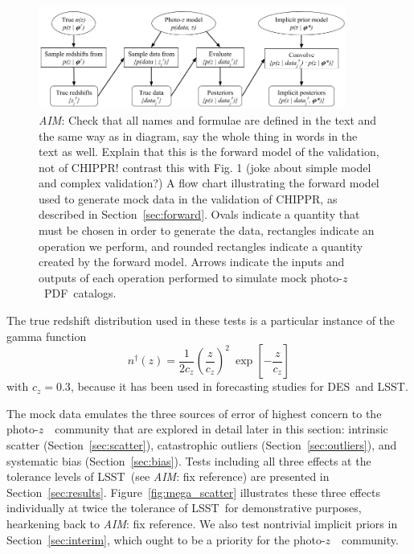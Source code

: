 \documentclass[iop]{emulateapj}
\newcommand{\todo}[3]{{\color{#2}\emph{#1}: #3}}
\newcommand{\aim}[1]{\todo{AIM}{red}{#1}}
\newcommand{\Sect}[1]{Section~\ref{#1}}
\newcommand{\Fig}[1]{Figure~\ref{#1}}
\newcommand{\project}[1]{{\textsc{#1}}}
\newcommand{\lsst}{\project{LSST}}
\newcommand{\des}{\project{DES}}
\newcommand{\Chippr}{\project{CHIPPR}}
\newcommand{\pz}{photo-$z$~}
\newcommand{\pzpdf}{\pz PDF}
\begin{document}
\begin{figure}
	\begin{center}
		\includegraphics[width=0.9\textwidth]{figures/chippr/flowchart.png}
		\caption{\aim{Check that all names and formulae are defined in the text and the same way as in diagram, say the whole thing in words in the text as well.
			Explain that this is the forward model of the validation, not of CHIPPR! contrast this with Fig. 1 (joke about simple model and complex validation?)}
			A flow chart illustrating the forward model used to generate mock data in the validation of \Chippr, as described in \Sect{sec:forward}.
			Ovals indicate a quantity that must be chosen in order to generate the data, rectangles indicate an operation we perform, and rounded rectangles indicate a quantity created by the forward model.
			Arrows indicate the inputs and outputs of each operation performed to simulate mock \pzpdf\ catalogs.}
		\label{fig:flowchart}
	\end{center}
\end{figure}

The true redshift distribution used in these tests is a particular instance of the gamma function
\begin{equation}
\label{eqn:gamma}
n^{\dagger}(z) = \frac{1}{2 c_{z}} \left(\frac{z}{c_{z}}\right)^{2}\ \exp\left[-\frac{z}{c_{z}}\right]
\end{equation}
with $c_{z} = 0.3$, because it has been used in forecasting studies for \des\ and \lsst.

The mock data emulates the three sources of error of highest concern to the \pz\ community that are explored in detail later in this section: intrinsic scatter (\Sect{sec:scatter}), catastrophic outliers (\Sect{sec:outliers}), and systematic bias (\Sect{sec:bias}).
Tests including all three effects at the tolerance levels of \lsst\ (see \aim{fix reference})
are presented in \Sect{sec:results}.
\Fig{fig:mega_scatter} illustrates these three effects individually at twice the tolerance of \lsst\ for demonstrative purposes, hearkening back to \aim{fix reference}.
We also test nontrivial implicit priors in \Sect{sec:interim}, which ought to be a priority for the \pz\ community.
\end{document}
